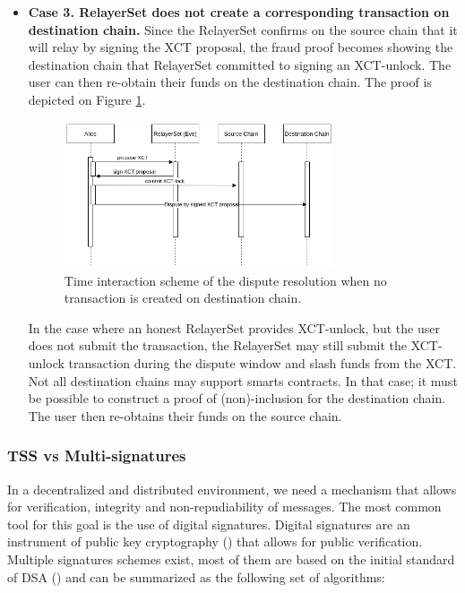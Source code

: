 \begin{itemize}
        \item \textbf{Case 3. RelayerSet does not create a corresponding transaction on destination chain.}
        Since the RelayerSet confirms on the source chain that it will relay by signing the XCT proposal, the fraud proof becomes showing the destination chain that RelayerSet committed to signing an XCT-unlock. The user can then re-obtain their funds on the destination chain. The proof is depicted on Figure \ref{fig:dispute3}.
        
        \begin{figure}[h]
            \centering
            \includegraphics[width=0.75\textwidth]{images/mosaic/phase3/dispute3.png}
            \caption{Time interaction scheme of the dispute resolution when no transaction is created on destination chain. }
            \label{fig:dispute3}
        \end{figure}
        
        In the case where an honest RelayerSet provides XCT-unlock, but the user does not submit the transaction, the RelayerSet may still submit the XCT-unlock transaction during the dispute window and slash funds from the XCT.
        Not all destination chains may support smarts contracts. In that case; it must be possible to construct a proof of (non)-inclusion for the destination chain. The user then re-obtains their funds on the source chain.

    \end{itemize}


\subsubsection{TSS vs Multi-signatures}

In a decentralized and distributed environment, we need a mechanism that allows for verification, integrity and non-repudiability of messages. The most common tool for this goal is the use of digital signatures. Digital signatures are an instrument of public key cryptography () that allows for public verification. Multiple signatures schemes exist, most of them are based on the initial standard of DSA () and can be summarized as the following set of algorithms:

